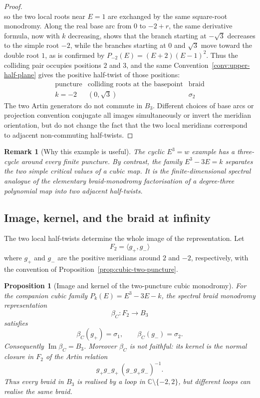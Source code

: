 \documentclass[11pt]{article}
\newtheorem{proposition}[theorem]{Proposition}
\newtheorem{remark}[theorem]{Remark}
\numberwithin{equation}{section}
\newcommand{\bbC}{\mathbb C}
\begin{document}
\begin{proof}
\[\]
so the two local roots near \(E=1\) are exchanged by the same square-root
monodromy.  Along the real base arc from \(0\) to \(-2+r\), the same derivative formula,
now with \(k\) decreasing, shows that the branch starting at \(-\sqrt3\)
decreases to the simple root \(-2\), while the branches starting at \(0\)
and \(\sqrt3\) move toward the double root \(1\), as is confirmed by
\(P_{-2}(E)=(E+2)(E-1)^2\).  Thus the colliding pair occupies positions
\(2\) and \(3\), and the same Convention~\ref{conv:upper-half-plane}
gives the positive half-twist of those positions:
\[
\begin{array}{c|c|c}
\text{puncture} & \text{colliding roots at the basepoint} & \text{braid}\\
\hline
 k=-2 & (0,\sqrt3) & \sigma_2
\end{array}
\]
The two Artin generators do not commute in \(B_3\).
Different choices of base arcs or projection convention conjugate all
images simultaneously or invert the meridian orientation, but do not change
the fact that the two local meridians correspond to adjacent non-commuting
half-twists.
\end{proof}

\begin{remark}[Why this example is useful]
The cyclic \(E^3=w\) example has a three-cycle around every finite
puncture.  By contrast, the family \(E^3-3E=k\) separates the two simple
critical values of a cubic map.  It is the finite-dimensional spectral
analogue of the elementary braid-monodromy factorisation of a degree-three
polynomial map into two adjacent half-twists.

\end{remark}

\subsection{Image, kernel, and the braid at infinity}

The two local half-twists determine the whole image of the representation.
Let
\[
  F_2=\langle g_+,g_-\rangle
\]
where \(g_+\) and \(g_-\) are the positive meridians around \(2\) and
\(-2\), respectively, with the convention of
Proposition~\ref{prop:cubic-two-puncture}.

\begin{proposition}[Image and kernel of the two-puncture cubic monodromy]\label{prop:cubic-image-kernel}
For the companion cubic family \(P_k(E)=E^3-3E-k\), the spectral braid
monodromy representation
\[
  \beta_C:F_2\longrightarrow B_3
\]
satisfies
\[
  \beta_C(g_+)=\sigma_1,\qquad \beta_C(g_-)=\sigma_2.
\]
Consequently \(\operatorname{Im}\beta_C=B_3\).  Moreover \(\beta_C\) is not
faithful: its kernel is the normal closure in \(F_2\) of the Artin relation
\[
  g_+g_-g_+\,(g_-g_+g_-)^{-1}.
\]
Thus every braid in \(B_3\) is realised by a loop in
\(\bbC\setminus\{-2,2\}\), but different loops can realise the same braid.
\end{proposition}
\end{document}
